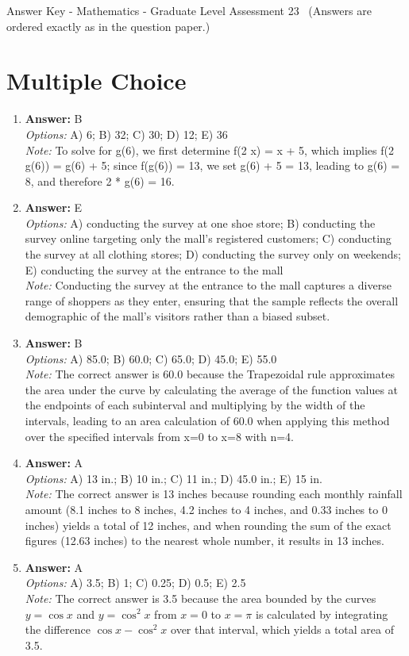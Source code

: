 \documentclass[12pt]{article}
\begin{document}
\begin{center}
Answer Key - Mathematics - Graduate Level Assessment 23 \
\small (Answers are ordered exactly as in the question paper.)
\end{center}

\section*{Multiple Choice}
\begin{enumerate}[label=\arabic*.]
\item \textbf{Answer:} B
\\ \textit{Options:} A) 6; B) 32; C) 30; D) 12; E) 36
\\ \textit{Note:} To solve for g(6), we first determine f(2 x) = x + 5, which implies f(2 g(6)) = g(6) + 5; since f(g(6)) = 13, we set g(6) + 5 = 13, leading to g(6) = 8, and therefore 2 * g(6) = 16.
\item \textbf{Answer:} E
\\ \textit{Options:} A) conducting the survey at one shoe store; B) conducting the survey online targeting only the mall's registered customers; C) conducting the survey at all clothing stores; D) conducting the survey only on weekends; E) conducting the survey at the entrance to the mall
\\ \textit{Note:} Conducting the survey at the entrance to the mall captures a diverse range of shoppers as they enter, ensuring that the sample reflects the overall demographic of the mall's visitors rather than a biased subset.
\item \textbf{Answer:} B
\\ \textit{Options:} A) 85.0; B) 60.0; C) 65.0; D) 45.0; E) 55.0
\\ \textit{Note:} The correct answer is 60.0 because the Trapezoidal rule approximates the area under the curve by calculating the average of the function values at the endpoints of each subinterval and multiplying by the width of the intervals, leading to an area calculation of 60.0 when applying this method over the specified intervals from x=0 to x=8 with n=4.
\item \textbf{Answer:} A
\\ \textit{Options:} A) 13 in.; B) 10 in.; C) 11 in.; D) 45.0 in.; E) 15 in.
\\ \textit{Note:} The correct answer is 13 inches because rounding each monthly rainfall amount (8.1 inches to 8 inches, 4.2 inches to 4 inches, and 0.33 inches to 0 inches) yields a total of 12 inches, and when rounding the sum of the exact figures (12.63 inches) to the nearest whole number, it results in 13 inches.
\item \textbf{Answer:} A
\\ \textit{Options:} A) 3.5; B) 1; C) 0.25; D) 0.5; E) 2.5
\\ \textit{Note:} The correct answer is 3.5 because the area bounded by the curves \( y = \cos x \) and \( y = \cos^2 x \) from \( x = 0 \) to \( x = \pi \) is calculated by integrating the difference \( \cos x - \cos^2 x \) over that interval, which yields a total area of 3.5.
\end{enumerate}
\end{document}
